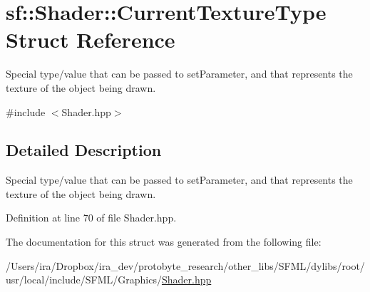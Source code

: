 \hypertarget{structsf_1_1_shader_1_1_current_texture_type}{\section{sf\-:\-:Shader\-:\-:Current\-Texture\-Type Struct Reference}
\label{structsf_1_1_shader_1_1_current_texture_type}
}


Special type/value that can be passed to set\-Parameter, and that represents the texture of the object being drawn.  




{\ttfamily \#include $<$Shader.\-hpp$>$}



\subsection{Detailed Description}
Special type/value that can be passed to set\-Parameter, and that represents the texture of the object being drawn. 

Definition at line 70 of file Shader.\-hpp.



The documentation for this struct was generated from the following file\-:\begin{DoxyCompactItemize}
\item 
/\-Users/ira/\-Dropbox/ira\-\_\-dev/protobyte\-\_\-research/other\-\_\-libs/\-S\-F\-M\-L/dylibs/root/usr/local/include/\-S\-F\-M\-L/\-Graphics/\hyperlink{_shader_8hpp}{Shader.\-hpp}\end{DoxyCompactItemize}

